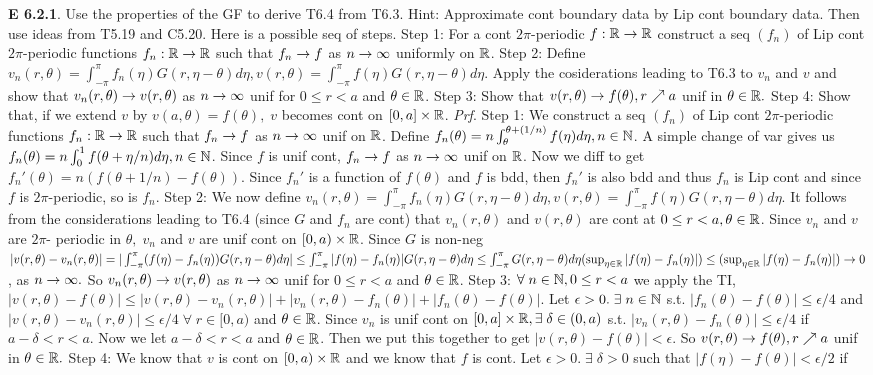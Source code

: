 {\bf E 6.2.1}. Use the properties of the GF to derive T6.4 from T6.3.  Hint:  Approximate cont boundary data by Lip cont boundary data.  Then use ideas from T5.19 and C5.20.  Here is a possible seq of steps. Step 1: For a cont $2\pi$-periodic $f: \mathbb{R} \rightarrow \mathbb{R}$ construct a seq $(f_n)$ of Lip cont $2\pi$-periodic functions $f_n: \mathbb{R} \rightarrow \mathbb{R}$ such that $f_n \rightarrow f$ as $n \rightarrow \infty$ uniformly on $\mathbb{R}$. Step 2:  Define $v_n(r,\theta) = \int_{-\pi}^{\pi} f_n(\eta) G(r,\eta-\theta) d\eta, v(r,\theta) = \int_{-\pi}^{\pi} f(\eta) G(r,\eta-\theta) d\eta$. Apply the cosiderations leading to T6.3 to $v_n$ and $v$ and show that $v_n(r, \theta) \rightarrow v(r, \theta)$ as $n \rightarrow \infty$ unif for $0 \leq r < a$ and $\theta \in \mathbb{R}$. Step 3:  Show that $v(r, \theta) \rightarrow f(\theta), r \nearrow a$ unif in $\theta \in \mathbb{R}.$  Step 4: Show that, if we extend $v$ by $v(a, \theta) = f(\theta), \; v$ becomes cont on $[0,a] \times \mathbb{R}$.  {\it Prf}.  Step 1:   We construct a seq $(f_n)$ of Lip cont $2\pi$-periodic functions $f_n: \mathbb{R} \rightarrow \mathbb{R}$ such that $f_n \rightarrow f$ as $n \rightarrow \infty$ unif on $\mathbb{R}$.  Define $f_n(\theta) = n \int_{\theta}^{\theta + (1/n)} f(\eta) d\eta,  n \in \mathbb{N}$. A simple change of var gives us $f_n (\theta) =  n \int_0^1 f(\theta + \eta/n) d\eta,  n \in \mathbb{N}$. Since $f$ is unif cont, $f_n \rightarrow f$ as $n \rightarrow \infty$ unif on $\mathbb{R}$.  Now we diff to get $f_n'(\theta) = n ( f(\theta + 1/n)-f(\theta)).$ Since  $f_n'$ is a function of $f(\theta)$ and $f$ is bdd, then $f_n'$ is also bdd and thus $f_n$ is Lip cont and since $f$ is $2\pi$-periodic, so is $f_n$. Step 2:  We now define $v_n(r,\theta) = \int_{-\pi}^{\pi} f_n (\eta) G(r,\eta-\theta) d\eta, v(r,\theta) = \int_{-\pi}^{\pi} f(\eta) G(r,\eta-\theta) d\eta$.  It follows from the considerations leading to T6.4 (since $G$ and $f_n$ are cont) that $v_n(r, \theta)$ and $v(r, \theta)$  are cont at $0 \leq r < a, \theta \in \mathbb{R}$.  Since $v_n$ and $v$ are $2\pi$- periodic in $\theta, \; v_n$ and $v$ are unif cont on $[0,a) \times \mathbb{R}$.  Since $G$ is non-neg $|v(r, \theta)-v_n(r,\theta)|=|\int_{-\pi}^{\pi} (f(\eta)-f_n(\eta)) G(r,\eta-\theta) d\eta| \leq \int_{-\pi}^{\pi} |f(\eta)-f_n(\eta)| G(r,\eta-\theta) d\eta \leq \int_{-\pi}^{\pi}  G(r,\eta-\theta)d\eta (\sup_{\eta \in \mathbb{R}}|f(\eta)-f_n(\eta)| ) \leq (\sup_{\eta \in \mathbb{R}}|f(\eta)-f_n(\eta)| ) \rightarrow 0$, as $n \rightarrow \infty.$ So $v_n(r, \theta) \rightarrow v(r, \theta)$ as $n \rightarrow \infty$ unif for $0 \leq r < a$ and $\theta \in \mathbb{R}$. Step 3:  $\forall \; n \in \mathbb{N}, 0 \leq r < a$ we apply the TI, $|v(r, \theta) - f(\theta)| \leq |v(r, \theta) - v_n(r, \theta)| + |v_n(r, \theta)-   f_n(\theta)| + | f_n(\theta)- f(\theta)|.$ Let $\epsilon > 0. \; \exists \; n \in \mathbb{N}$ s.t. $| f_n(\theta)- f(\theta)| \leq \epsilon/4$ and $|v(r, \theta) - v_n(r, \theta)| \leq \epsilon / 4 \; \forall \; r \in [0,a)$ and $\theta \in \mathbb{R}$.  Since $v_n$ is unif cont on $[0,a] \times \mathbb{R}, \exists \; \delta \in (0,a)$ s.t. $|v_n(r, \theta)-   f_n(\theta)| \leq \epsilon /4$ if $a-\delta < r < a$. Now we let $a-\delta < r < a$ and $\theta \in \mathbb{R}$. Then we put this together to get $|v(r, \theta) - f(\theta)| < \epsilon$. So $v(r, \theta) \rightarrow f(\theta), r \nearrow a$ unif in $\theta \in \mathbb{R}.$  Step 4:  We know that $v$ is cont on $[0, a) \times \mathbb{R}$ and we know that $f$ is cont.  Let $\epsilon > 0. \; \exists \; \delta >0$ such that $|f(\eta)-f(\theta)| < \epsilon/2$ if 